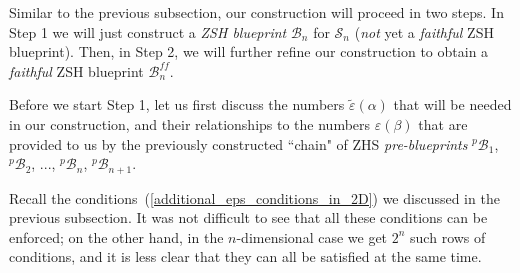 \documentclass[12pt,letterpaper]{article}
\renewcommand{\S}{\mathcal{S}}
\newcommand{\B}{\mathcal{B}}
\newcommand{\eps}{\varepsilon}
\newcommand{\et}{\tilde\eps}
\renewcommand{\a}{\alpha}
\begin{document}
\bigskip


Similar to the previous subsection, our construction will proceed in two steps. In Step 1 we will just construct a {\em  ZSH blueprint} $\B_n$ for $\S_n$ ({\em not} yet a {\em faithful} ZSH blueprint). 
Then, in Step 2, we will further refine our construction to obtain a  {\em faithful} ZSH blueprint $\B_n^\mathit{ff}$.

\bigskip 

Before we start Step 1, let us first discuss the numbers $\et(\a)$ that will be needed in our construction, and their relationships to the numbers $\eps(\beta)$ that are provided to us by the previously constructed  ``chain" of ZHS {\em pre-blueprints} $^p\!\B_1$, $^p\!\B_2$, ..., $^p\!\B_n$, $^p\!\B_{n+1}$.  

Recall the conditions~(\ref{additional_eps_conditions_in_2D}) we discussed in the previous subsection. It was not difficult to see that all these conditions can be enforced; on the other hand, in the $n$-dimensional case we get $2^n$ such rows of conditions, and it is less clear that they can all be satisfied at the same time. 
\end{document}

